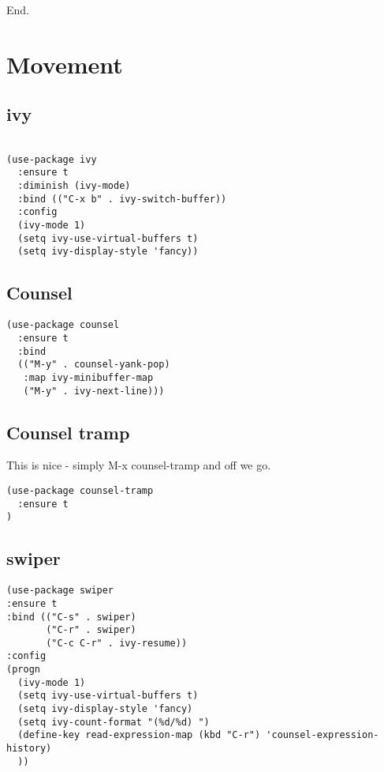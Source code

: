 \documentclass[12pt]{article}
\begin{document}
End. 

\section{Movement}
\label{sec:orgdf9578b}

\subsection{ivy}
\label{sec:orged04c2e}

\begin{verbatim}

(use-package ivy
  :ensure t
  :diminish (ivy-mode)
  :bind (("C-x b" . ivy-switch-buffer))
  :config 
  (ivy-mode 1)
  (setq ivy-use-virtual-buffers t) 
  (setq ivy-display-style 'fancy))

\end{verbatim}

\subsection{Counsel}
\label{sec:org8573436}

\begin{verbatim}
(use-package counsel
  :ensure t
  :bind
  (("M-y" . counsel-yank-pop)
   :map ivy-minibuffer-map
   ("M-y" . ivy-next-line)))
\end{verbatim}

\subsection{Counsel tramp}
\label{sec:org85ea291}
This is nice - simply M-x counsel-tramp and off we go. 

\lstset{language=Lisp,label= ,caption= ,captionpos=b,numbers=none}
\begin{lstlisting}
(use-package counsel-tramp 
  :ensure t
)

\end{lstlisting}

\subsection{swiper}
\label{sec:org4e789a0}

\lstset{language=Lisp,label= ,caption= ,captionpos=b,numbers=none}
\begin{lstlisting}
(use-package swiper
:ensure t
:bind (("C-s" . swiper)
       ("C-r" . swiper)
       ("C-c C-r" . ivy-resume))
:config 
(progn 
  (ivy-mode 1)
  (setq ivy-use-virtual-buffers t)
  (setq ivy-display-style 'fancy)
  (setq ivy-count-format "(%d/%d) ")
  (define-key read-expression-map (kbd "C-r") 'counsel-expression-history)
  ))

\end{lstlisting}
\end{document}
